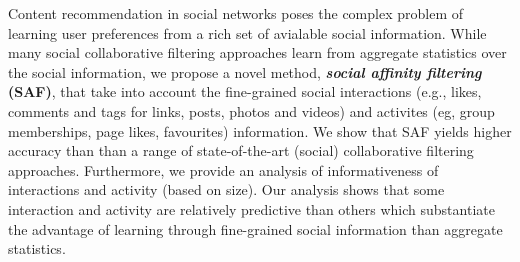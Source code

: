 Content recommendation in social networks poses the complex problem of
learning user preferences from a rich set of avialable social information.
While many social collaborative filtering approaches learn from aggregate statistics over the
social information, we propose a novel method, \textbf{\textit{social affinity filtering} (SAF)}, 
that take into account the fine-grained social interactions (e.g., likes, comments and tags for 
links, posts, photos and videos) and activites (eg, group memberships, page likes, favourites) 
information. We show that SAF yields higher accuracy than than a range of state-of-the-art 
(social) collaborative filtering approaches.
Furthermore, we provide an analysis of informativeness of interactions and activity (based
on size). Our analysis shows that some interaction and activity are relatively predictive than others which 
substantiate the advantage of learning through fine-grained social information than aggregate statistics.




